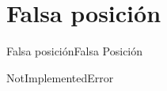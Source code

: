 \documentclass[spanish, c]{beamer}
\begin{document}
\section{Falsa posición}

\begin{frame}{Falsa posición}{Falsa Posición}

    \begin{center}
        \Huge NotImplementedError
    \end{center}
\end{frame}




\end{document}
